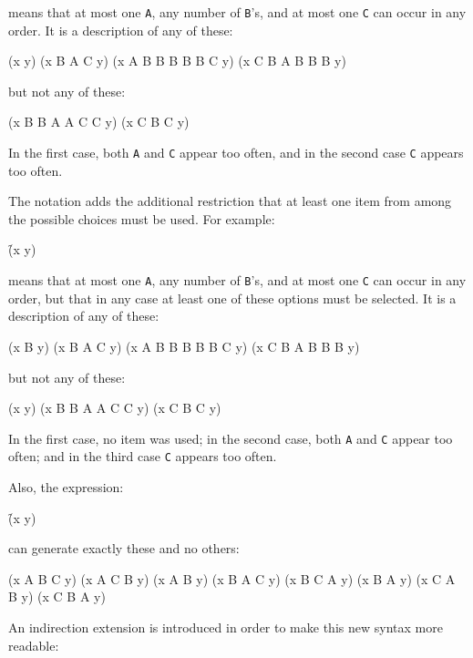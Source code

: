 \noindent means that at most one {\tt A}, any number of {\tt B}'s, and
at most one {\tt C} can occur in any order.
It is a description of any of these:

\code
 (x y)
 (x B A C y)
 (x A B B B B B C y)
 (x C B A B B B y)
\endcode

\noindent but not any of these:

\code
 (x B B A A C C y)
 (x C B C y)
\endcode

\noindent In the first case, both {\tt A} and {\tt C} appear too often,
and in the second case {\tt C} appears too often.


The notation  
adds the additional restriction that at least one item from among the possible
choices must be used.  For example:

\f{(x  y)}

\noindent means that at most one {\tt A}, any number of {\tt B}'s, and
at most one {\tt C} can occur in any order, but that in any case at least
one of these options must be selected.
It is a description of any of these:

\code
 (x B y)
 (x B A C y)
 (x A B B B B B C y)
 (x C B A B B B y)
\endcode

\noindent but not any of these:

\code
 (x y)
 (x B B A A C C y)
 (x C B C y)
\endcode

\noindent In the first case, no item was used;
in the second case, both {\tt A} and {\tt C} appear too often;
and in the third case {\tt C} appears too often.

Also, the expression:

\f{(x  y)}

\noindent can generate exactly these and no others:

\code
 (x A B C y)
 (x A C B y)
 (x A B y)
 (x B A C y)
 (x B C A y)
 (x B A y)
 (x C A B y)
 (x C B A y)
\endcode


\endsubsubsubsection%


An indirection extension is introduced in order to make this
new syntax more readable:

